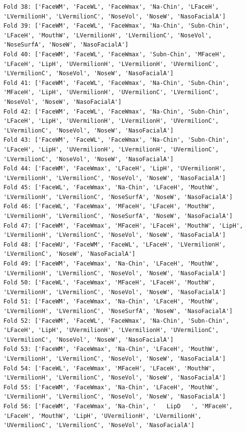 \documentclass[12pt,a4paper]{article}
\begin{document}
\begin{verbatim}
Fold 38: ['FaceWM', 'FaceWL', 'FaceWmax', 'Na-Chin', 'LFaceH', 'LVermilionH', 'LVermilionC', 'NoseVol', 'NoseW', 'NasoFacialA']
Fold 39: ['FaceWM', 'FaceWL', 'FaceWmax', 'Na-Chin', 'Subn-Chin', 'LFaceH', 'MouthW', 'LVermilionH', 'LVermilionC', 'NoseVol', 'NoseSurfA', 'NoseW', 'NasoFacialA']
Fold 40: ['FaceWM', 'FaceWL', 'FaceWmax', 'Subn-Chin', 'MFaceH', 'LFaceH', 'LipH', 'UVermilionH', 'LVermilionH', 'UVermilionC', 'LVermilionC', 'NoseVol', 'NoseW', 'NasoFacialA']
Fold 41: ['FaceWM', 'FaceWL', 'FaceWmax', 'Na-Chin', 'Subn-Chin', 'MFaceH', 'LipH', 'UVermilionH', 'UVermilionC', 'LVermilionC', 'NoseVol', 'NoseW', 'NasoFacialA']
Fold 42: ['FaceWM', 'FaceWL', 'FaceWmax', 'Na-Chin', 'Subn-Chin', 'LFaceH', 'LipH', 'UVermilionH', 'LVermilionH', 'UVermilionC', 'LVermilionC', 'NoseVol', 'NoseW', 'NasoFacialA']
Fold 43: ['FaceWM', 'FaceWL', 'FaceWmax', 'Na-Chin', 'Subn-Chin', 'LFaceH', 'LipH', 'UVermilionH', 'LVermilionH', 'UVermilionC', 'LVermilionC', 'NoseVol', 'NoseW', 'NasoFacialA']
Fold 44: ['FaceWM', 'FaceWmax', 'LFaceH', 'LipH', 'UVermilionH', 'LVermilionH', 'LVermilionC', 'NoseVol', 'NoseW', 'NasoFacialA']
Fold 45: ['FaceWL', 'FaceWmax', 'Na-Chin', 'LFaceH', 'MouthW', 'LVermilionH', 'LVermilionC', 'NoseSurfA', 'NoseW', 'NasoFacialA']
Fold 46: ['FaceWL', 'FaceWmax', 'MFaceH', 'LFaceH', 'MouthW', 'LVermilionH', 'LVermilionC', 'NoseSurfA', 'NoseW', 'NasoFacialA']
Fold 47: ['FaceWM', 'FaceWmax', 'MFaceH', 'LFaceH', 'MouthW', 'LipH', 'LVermilionH', 'LVermilionC', 'NoseVol', 'NoseW', 'NasoFacialA']
Fold 48: ['FaceWU', 'FaceWM', 'FaceWL', 'LFaceH', 'LVermilionH', 'LVermilionC', 'NoseW', 'NasoFacialA']
Fold 49: ['FaceWM', 'FaceWmax', 'Na-Chin', 'LFaceH', 'MouthW', 'LVermilionH', 'LVermilionC', 'NoseVol', 'NoseW', 'NasoFacialA']
Fold 50: ['FaceWL', 'FaceWmax', 'MFaceH', 'LFaceH', 'MouthW', 'LVermilionH', 'LVermilionC', 'NoseVol', 'NoseW', 'NasoFacialA']
Fold 51: ['FaceWM', 'FaceWmax', 'Na-Chin', 'LFaceH', 'MouthW', 'LVermilionH', 'LVermilionC', 'NoseSurfA', 'NoseW', 'NasoFacialA']
Fold 52: ['FaceWM', 'FaceWL', 'FaceWmax', 'Na-Chin', 'Subn-Chin', 'LFaceH', 'LipH', 'UVermilionH', 'LVermilionH', 'UVermilionC', 'LVermilionC', 'NoseVol', 'NoseW', 'NasoFacialA']
Fold 53: ['FaceWM', 'FaceWmax', 'Na-Chin', 'LFaceH', 'MouthW', 'LVermilionH', 'LVermilionC', 'NoseVol', 'NoseW', 'NasoFacialA']
Fold 54: ['FaceWL', 'FaceWmax', 'MFaceH', 'LFaceH', 'MouthW', 'LVermilionH', 'LVermilionC', 'NoseVol', 'NoseW', 'NasoFacialA']
Fold 55: ['FaceWM', 'FaceWmax', 'Na-Chin', 'LFaceH', 'MouthW', 'LVermilionH', 'LVermilionC', 'NoseVol', 'NoseW', 'NasoFacialA']
Fold 56: ['FaceWM', 'FaceWmax', 'Na-Chin', '   LipD   ', 'MFaceH', 'LFaceH', 'MouthW', 'LipH', 'UVermilionH', 'LVermilionH', 'UVermilionC', 'LVermilionC', 'NoseVol', 'NasoFacialA']

\end{verbatim}
\end{document}
